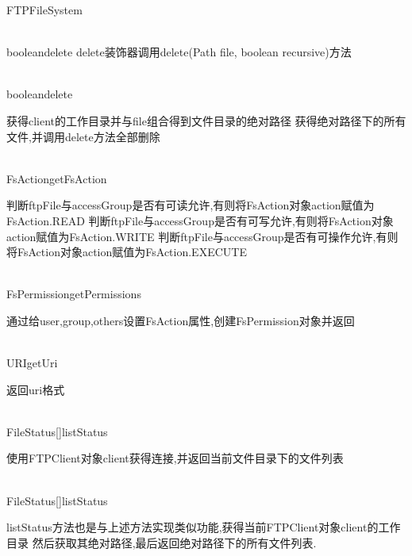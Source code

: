 \begin{XeClass}{FTPFileSystem}
\begin{XeMethod}{\XePrivate\\ }{boolean}{delete}
 delete装饰器调用delete(Path file, boolean recursive)方法

  \end{XeMethod}

  \begin{XeMethod}{\XePrivate\\ }{boolean}{delete}
       
 获得client的工作目录并与file组合得到文件目录的绝对路径
 获得绝对路径下的所有文件,并调用delete方法全部删除

  \end{XeMethod}

  \begin{XeMethod}{\XePrivate\\ }{FsAction}{getFsAction}
       
 判断ftpFile与accessGroup是否有可读允许,有则将FsAction对象action赋值为FsAction.READ
 判断ftpFile与accessGroup是否有可写允许,有则将FsAction对象action赋值为FsAction.WRITE
 判断ftpFile与accessGroup是否有可操作允许,有则将FsAction对象action赋值为FsAction.EXECUTE

  \end{XeMethod}

  \begin{XeMethod}{\XePrivate\\ }{FsPermission}{getPermissions}
       
 通过给user,group,others设置FsAction属性,创建FsPermission对象并返回

  \end{XeMethod}

  \begin{XeMethod}{\XePublic\\ }{URI}{getUri}
       
 返回uri格式

  \end{XeMethod}

  \begin{XeMethod}{\XePublic\\ }{FileStatus[]}{listStatus}
       
 使用FTPClient对象client获得连接,并返回当前文件目录下的文件列表

  \end{XeMethod}

  \begin{XeMethod}{\XePrivate\\ }{FileStatus[]}{listStatus}
       
 listStatus方法也是与上述方法实现类似功能,获得当前FTPClient对象client的工作目录
 然后获取其绝对路径,最后返回绝对路径下的所有文件列表.


\end{XeMethod}
\end{XeClass}
